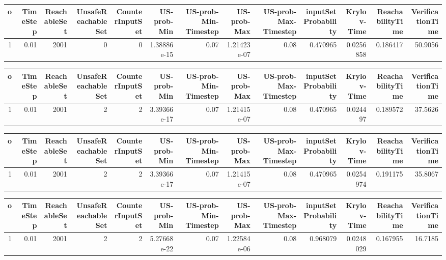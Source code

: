 \begin{tabular}{rrrrrrrrrrrrr}
\hline
   o &   TimeStep &   ReachableSet &   UnsafeReachableSet &   CounterInputSet &   US-prob-Min &   US-prob-Min-Timestep &   US-prob-Max &   US-prob-Max-Timestep &   inputSet Probability &   Krylov-Time &   ReachabilityTime &   VerificationTime \\
\hline
   1 &       0.01 &           2001 &                    0 &                 0 &   1.38886e-15 &                   0.07 &   1.21423e-07 &                   0.08 &               0.470965 &     0.0256858 &           0.186417 &            50.9056 \\
\hline
\end{tabular}
\begin{tabular}{rrrrrrrrrrrrr}
\hline
   o &   TimeStep &   ReachableSet &   UnsafeReachableSet &   CounterInputSet &   US-prob-Min &   US-prob-Min-Timestep &   US-prob-Max &   US-prob-Max-Timestep &   inputSet Probability &   Krylov-Time &   ReachabilityTime &   VerificationTime \\
\hline
   1 &       0.01 &           2001 &                    2 &                 2 &   3.39366e-17 &                   0.07 &   1.21415e-07 &                   0.08 &               0.470965 &      0.024497 &           0.189572 &            37.5626 \\
\hline
\end{tabular}
\begin{tabular}{rrrrrrrrrrrrr}
\hline
   o &   TimeStep &   ReachableSet &   UnsafeReachableSet &   CounterInputSet &   US-prob-Min &   US-prob-Min-Timestep &   US-prob-Max &   US-prob-Max-Timestep &   inputSet Probability &   Krylov-Time &   ReachabilityTime &   VerificationTime \\
\hline
   1 &       0.01 &           2001 &                    2 &                 2 &   3.39366e-17 &                   0.07 &   1.21415e-07 &                   0.08 &               0.470965 &     0.0254974 &           0.191175 &            35.8067 \\
\hline
\end{tabular}
\begin{tabular}{rrrrrrrrrrrrr}
\hline
   o &   TimeStep &   ReachableSet &   UnsafeReachableSet &   CounterInputSet &   US-prob-Min &   US-prob-Min-Timestep &   US-prob-Max &   US-prob-Max-Timestep &   inputSet Probability &   Krylov-Time &   ReachabilityTime &   VerificationTime \\
\hline
   1 &       0.01 &           2001 &                    2 &                 2 &   5.27668e-22 &                   0.07 &   1.22584e-06 &                   0.08 &               0.968079 &     0.0248029 &           0.167955 &            16.7185 \\
\hline
\end{tabular}
